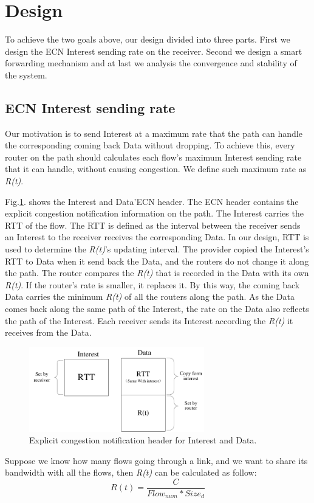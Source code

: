 
\section{Design}
To achieve the two goals above, our design divided into three parts. First we design the ECN Interest sending rate on the receiver. Second we design a smart forwarding mechanism and at last we analysis the convergence and stability of the system.

\subsection{ECN Interest sending rate}
Our motivation is to send Interest at a maximum rate that the path can handle the corresponding coming back Data without dropping. To achieve this, every router on the path should calculates each flow's maximum Interest sending rate that it can handle, without causing congestion. We define such maximum rate as \emph{R(t)}.

Fig.\ref{fig-header}. shows the Interest and Data'ECN header. The ECN header contains the explicit congestion notification information on the path. The Interest carries the RTT of the flow. The RTT is defined as the interval between the receiver sends an Interest to the receiver receives the corresponding Data. In our design, RTT is used to determine the \emph{R(t)}'s updating interval. The provider copied the Interest's RTT to Data when it send back the Data, and the routers do not change it along the path. The router compares the \emph{R(t)} that is recorded in the Data with its own  \emph{R(t)}. If the router's rate is smaller, it replaces it. By this way, the coming back Data carries the minimum  \emph{R(t)} of all the routers along the path. As the Data comes back along the same path of the Interest, the rate on the Data also reflects the path of the Interest. Each receiver sends its Interest according the  \emph{R(t)} it receives from the Data.

\begin{figure}[t]
\centering
\includegraphics[width=3in]{header-ndn.pdf}
\centering
\caption{Explicit congestion notification header for Interest and Data.}
\label{fig-header}
\end{figure}
 Suppose we know how many flows going through a link, and we want to share its bandwidth with all the flows, then \emph{R(t)} can be calculated as follow:
\begin{equation}
R(t)=\frac{C}{Flow_{num}*Size_{d}}
\end{equation}

